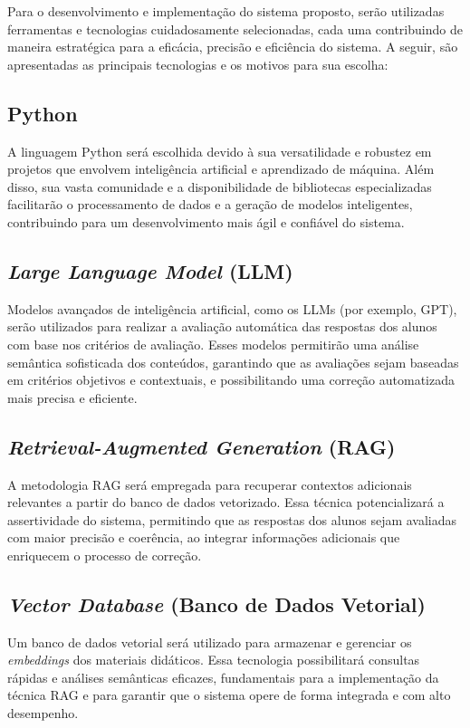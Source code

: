 Para o desenvolvimento e implementação do sistema proposto, serão utilizadas ferramentas e tecnologias cuidadosamente selecionadas, cada uma contribuindo de maneira estratégica para a eficácia, precisão e eficiência do sistema. A seguir, são apresentadas as principais tecnologias e os motivos para sua escolha:

\subsection{Python}
A linguagem Python será escolhida devido à sua versatilidade e robustez em projetos que envolvem inteligência artificial e aprendizado de máquina. Além disso, sua vasta comunidade e a disponibilidade de bibliotecas especializadas facilitarão o processamento de dados e a geração de modelos inteligentes, contribuindo para um desenvolvimento mais ágil e confiável do sistema.

\subsection{\textit{Large Language Model} (LLM)}
Modelos avançados de inteligência artificial, como os LLMs (por exemplo, GPT), serão utilizados para realizar a avaliação automática das respostas dos alunos com base nos critérios de avaliação. Esses modelos permitirão uma análise semântica sofisticada dos conteúdos, garantindo que as avaliações sejam baseadas em critérios objetivos e contextuais, e possibilitando uma correção automatizada mais precisa e eficiente.

\subsection{\textit{Retrieval-Augmented Generation} (RAG)}
A metodologia RAG será empregada para recuperar contextos adicionais relevantes a partir do banco de dados vetorizado. Essa técnica potencializará a assertividade do sistema, permitindo que as respostas dos alunos sejam avaliadas com maior precisão e coerência, ao integrar informações adicionais que enriquecem o processo de correção.

\subsection{\textit{Vector Database} (Banco de Dados Vetorial)}
Um banco de dados vetorial será utilizado para armazenar e gerenciar os \textit{embeddings} dos materiais didáticos. Essa tecnologia possibilitará consultas rápidas e análises semânticas eficazes, fundamentais para a implementação da técnica RAG e para garantir que o sistema opere de forma integrada e com alto desempenho.

